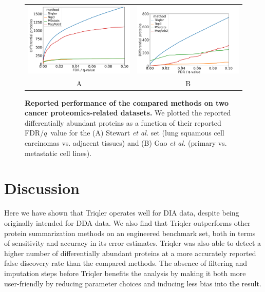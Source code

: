 \documentclass[10pt,letterpaper]{article}
\begin{document}
\begin{figure}[hbt]
    \centering
    \begin{tabular}{cc} 
        \includegraphics[width=0.45\linewidth]{./img/pxd004684.png} & 
        \includegraphics[width=0.45\linewidth]{./img/pxd022992.png} \\
        A & B \\
    \end{tabular}
  \caption{{\bf Reported performance of the compared methods on two cancer proteomics-related datasets.} We plotted the reported differentially abundant proteins as a function of their reported FDR/$q$~value for the (A) Stewart {\em et al.} set (lung squamous cell carcinomas vs. adjacent tissues) and (B) Gao {\em et al.} (primary vs. metastatic cell lines). \label{fig:non-engineered}}
\end{figure}


\section*{Discussion}

Here we have shown that Triqler operates well for DIA data, despite being originally intended for DDA data. We also find that Triqler outperforms other protein summarization methods on an engineered benchmark set, both in terms of sensitivity and accuracy in its error estimates. Triqler was also able to detect a higher number of differentially abundant proteins at a more accurately reported false discovery rate than the compared methods. The absence of filtering and imputation steps before Triqler benefits the analysis by making it both more user-friendly by reducing parameter choices and inducing less bias into the result. 
\end{document}
